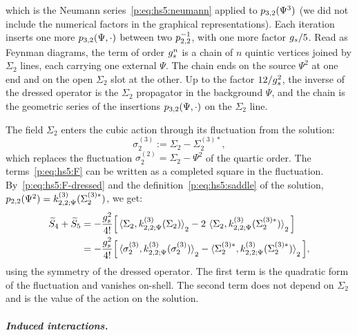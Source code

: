 which is the Neumann series~\eqref{p:eq:hs5:neumann} applied to $p_{3,2}(\Psi^3)$ (we did not include the numerical factors in the graphical representations).
Each iteration inserts one more $p_{3,2}(\Psi, \cdot)$ between two $p_{2,2}^{-1}$, with one more factor $g_s / 5$.
Read as Feynman diagrams, the term of order $g_s^n$ is a chain of $n$ quintic vertices joined by $\Sigma_2$ lines, each carrying one external $\Psi$.
The chain ends on the source $\Psi^2$ at one end and on the open $\Sigma_2$ slot at the other.
Up to the factor $12 / g_s^2$, the inverse of the dressed operator is the $\Sigma_2$ propagator in the background $\Psi$, and the chain is the geometric series of the insertions $p_{3,2}(\Psi, \cdot)$ on the $\Sigma_2$ line.

The field $\Sigma_2$ enters the cubic action through its fluctuation from the solution:
\begin{equation}
  \label{p:eq:hs5:deviation}
  \sigma_2^{(3)}
    := \Sigma_2 - \Sigma_2^{(3)*},
\end{equation}
which replaces the fluctuation $\sigma_2^{(2)} = \Sigma_2 - \Psi^2$ of the quartic order.
The terms~\eqref{p:eq:hs5:F} can be written as a completed square in the fluctuation.
By~\eqref{p:eq:hs5:F-dressed} and the definition~\eqref{p:eq:hs5:saddle} of the solution, $\sprod{2}{2}(\Psi^2) = \kin{2}{\Psi}{3}(\Sigma_2^{(3)*})$, we get:
\begin{equation}
\label{p:eq:hs5:square}
\begin{aligned}
  \caction[4] + \caction[5]
    &
    = - \frac{\gs^2}{4!} \Big[ \pair[2]{\Sigma_2}{\kin{2}{\Psi}{3}(\Sigma_2)} - 2 \, \pair[2]{\Sigma_2}{\kin{2}{\Psi}{3}(\Sigma_2^{(3)*})} \Big]
    \\ &
    = - \frac{\gs^2}{4!} \Big[ \pair[2]{\sigma_2^{(3)}}{\kin{2}{\Psi}{3}(\sigma_2^{(3)})} - \pair[2]{\Sigma_2^{(3)*}}{\kin{2}{\Psi}{3}(\Sigma_2^{(3)*})} \Big],
\end{aligned}
\end{equation}
using the symmetry of the dressed operator.
The first term is the quadratic form of the fluctuation and vanishes on-shell.
The second term does not depend on $\Sigma_2$ and is the value of the action on the solution.


\subparagraph{Induced interactions.}

